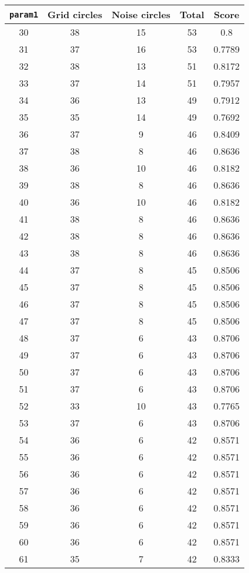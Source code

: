 \documentclass[letterpaper, 12pt]{article}
\begin{document}
\begin{longtable}{|c|c|c|c|c|}
\hline
\textbf{\texttt{param1}} & \textbf{Grid circles} & \textbf{Noise circles} & \textbf{Total} & \textbf{Score} \\
\hline
30 & 38 & 15 & 53 & 0.8 \\
\hline
31 & 37 & 16 & 53 & 0.7789 \\
\hline
32 & 38 & 13 & 51 & 0.8172 \\
\hline
33 & 37 & 14 & 51 & 0.7957 \\
\hline
34 & 36 & 13 & 49 & 0.7912 \\
\hline
35 & 35 & 14 & 49 & 0.7692 \\
\hline
36 & 37 & 9 & 46 & 0.8409 \\
\hline
37 & 38 & 8 & 46 & 0.8636 \\
\hline
38 & 36 & 10 & 46 & 0.8182 \\
\hline
39 & 38 & 8 & 46 & 0.8636 \\
\hline
40 & 36 & 10 & 46 & 0.8182 \\
\hline
41 & 38 & 8 & 46 & 0.8636 \\
\hline
42 & 38 & 8 & 46 & 0.8636 \\
\hline
43 & 38 & 8 & 46 & 0.8636 \\
\hline
44 & 37 & 8 & 45 & 0.8506 \\
\hline
45 & 37 & 8 & 45 & 0.8506 \\
\hline
46 & 37 & 8 & 45 & 0.8506 \\
\hline
47 & 37 & 8 & 45 & 0.8506 \\
\hline
48 & 37 & 6 & 43 & 0.8706 \\
\hline
49 & 37 & 6 & 43 & 0.8706 \\
\hline
50 & 37 & 6 & 43 & 0.8706 \\
\hline
51 & 37 & 6 & 43 & 0.8706 \\
\hline
52 & 33 & 10 & 43 & 0.7765 \\
\hline
53 & 37 & 6 & 43 & 0.8706 \\
\hline
54 & 36 & 6 & 42 & 0.8571 \\
\hline
55 & 36 & 6 & 42 & 0.8571 \\
\hline
56 & 36 & 6 & 42 & 0.8571 \\
\hline
57 & 36 & 6 & 42 & 0.8571 \\
\hline
58 & 36 & 6 & 42 & 0.8571 \\
\hline
59 & 36 & 6 & 42 & 0.8571 \\
\hline
60 & 36 & 6 & 42 & 0.8571 \\
\hline
61 & 35 & 7 & 42 & 0.8333 \\

\end{longtable}
\end{document}
